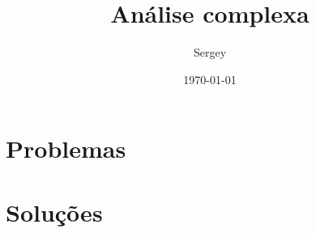 \documentclass[brazilian,a4paper]{scrartcl}
\author{Sergey}
\title{Análise complexa}
\date{\today}
\begin{document}
\maketitle
\tableofcontents

\appendix
\section{Problemas}

\section{Soluções}

\end{document}
